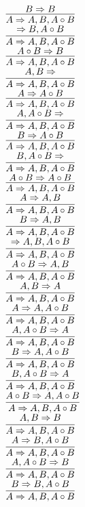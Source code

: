 \documentclass[11pt]{article}
\begin{document}
\begin{center}
\bigskip
\\$\infer{A\Rightarrow A, B, A\circ B}{B\Rightarrow B}$
\bigskip
\\$\infer{A\Rightarrow A, B, A\circ B}{\Rightarrow B, A\circ B}$
\bigskip
\\$\infer{A\Rightarrow A, B, A\circ B}{A\circ B\Rightarrow B}$
\bigskip
\\$\infer{A\Rightarrow A, B, A\circ B}{A, B\Rightarrow }$
\bigskip
\\$\infer{A\Rightarrow A, B, A\circ B}{A\Rightarrow A\circ B}$
\bigskip
\\$\infer{A\Rightarrow A, B, A\circ B}{A, A\circ B\Rightarrow }$
\bigskip
\\$\infer{A\Rightarrow A, B, A\circ B}{B\Rightarrow A\circ B}$
\bigskip
\\$\infer{A\Rightarrow A, B, A\circ B}{B, A\circ B\Rightarrow }$
\bigskip
\\$\infer{A\Rightarrow A, B, A\circ B}{A\circ B\Rightarrow A\circ B}$
\bigskip
\\$\infer{A\Rightarrow A, B, A\circ B}{A\Rightarrow A, B}$
\bigskip
\\$\infer{A\Rightarrow A, B, A\circ B}{B\Rightarrow A, B}$
\bigskip
\\$\infer{A\Rightarrow A, B, A\circ B}{\Rightarrow A, B, A\circ B}$
\bigskip
\\$\infer{A\Rightarrow A, B, A\circ B}{A\circ B\Rightarrow A, B}$
\bigskip
\\$\infer{A\Rightarrow A, B, A\circ B}{A, B\Rightarrow A}$
\bigskip
\\$\infer{A\Rightarrow A, B, A\circ B}{A\Rightarrow A, A\circ B}$
\bigskip
\\$\infer{A\Rightarrow A, B, A\circ B}{A, A\circ B\Rightarrow A}$
\bigskip
\\$\infer{A\Rightarrow A, B, A\circ B}{B\Rightarrow A, A\circ B}$
\bigskip
\\$\infer{A\Rightarrow A, B, A\circ B}{B, A\circ B\Rightarrow A}$
\bigskip
\\$\infer{A\Rightarrow A, B, A\circ B}{A\circ B\Rightarrow A, A\circ B}$
\bigskip
\\$\infer{A\Rightarrow A, B, A\circ B}{A, B\Rightarrow B}$
\bigskip
\\$\infer{A\Rightarrow A, B, A\circ B}{A\Rightarrow B, A\circ B}$
\bigskip
\\$\infer{A\Rightarrow A, B, A\circ B}{A, A\circ B\Rightarrow B}$
\bigskip
\\$\infer{A\Rightarrow A, B, A\circ B}{B\Rightarrow B, A\circ B}$

\end{center}
\end{document}
